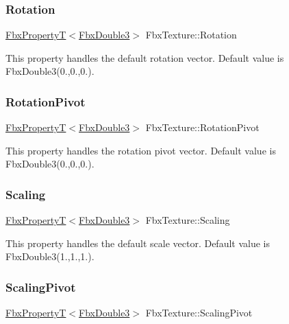 \subsubsection{\texorpdfstring{Rotation}{Rotation}}
{\footnotesize\ttfamily \hyperlink{class_fbx_property_t}{Fbx\+PropertyT}$<$\hyperlink{fbxtypes_8h_ae0a96f14cde566774c7553aa7523b7a7}{Fbx\+Double3}$>$ Fbx\+Texture\+::\+Rotation}

This property handles the default rotation vector. Default value is Fbx\+Double3(0.,0.,0.). \mbox{\label{class_fbx_texture_ae3f8835e136b889fbcd6b388c452310e}} 
\subsubsection{\texorpdfstring{Rotation\+Pivot}{RotationPivot}}
{\footnotesize\ttfamily \hyperlink{class_fbx_property_t}{Fbx\+PropertyT}$<$\hyperlink{fbxtypes_8h_ae0a96f14cde566774c7553aa7523b7a7}{Fbx\+Double3}$>$ Fbx\+Texture\+::\+Rotation\+Pivot}

This property handles the rotation pivot vector. Default value is Fbx\+Double3(0.,0.,0.). \mbox{\label{class_fbx_texture_a0fb4219993fe8b6fcad89b62d22d2489}} 
\subsubsection{\texorpdfstring{Scaling}{Scaling}}
{\footnotesize\ttfamily \hyperlink{class_fbx_property_t}{Fbx\+PropertyT}$<$\hyperlink{fbxtypes_8h_ae0a96f14cde566774c7553aa7523b7a7}{Fbx\+Double3}$>$ Fbx\+Texture\+::\+Scaling}

This property handles the default scale vector. Default value is Fbx\+Double3(1.,1.,1.). \mbox{\label{class_fbx_texture_acf9aad8b79662d0cd8f3d336d0414dee}} 
\subsubsection{\texorpdfstring{Scaling\+Pivot}{ScalingPivot}}
{\footnotesize\ttfamily \hyperlink{class_fbx_property_t}{Fbx\+PropertyT}$<$\hyperlink{fbxtypes_8h_ae0a96f14cde566774c7553aa7523b7a7}{Fbx\+Double3}$>$ Fbx\+Texture\+::\+Scaling\+Pivot}

